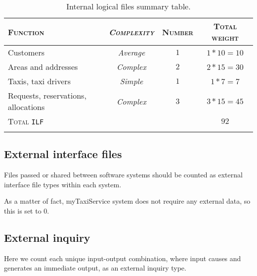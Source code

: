 \begin{table*}\begin{tabularx}{\textwidth}{ X >{\itshape}C{\myWFP} C{\myWFP} C{\myWFP} }

\toprule
	
	\normalfont\textsc{Function} &
	\normalfont\textsc{Complexity}	& 
	\normalfont\textsc{Number} &
	\normalfont\textsc{Total weight} \\

\toprule

	Customers	& Average	& $ 1 $		& $ 1*10 = 10 $ \\
\midrule
	Areas and addresses		& Complex	& $ 2 $		& $ 2*15 = 30 $ \\
\midrule
	Taxis, taxi drivers		& Simple		& $ 1 $		& $ 1*7 = 7 $ \\
\midrule
	Requests, reservations, allocations	& Complex	& $ 3 $ 	& $ 3*15 = 45 $ \\

\bottomrule

\normalfont\textsc{Total} \texttt{ILF} && & $ 92 $ \\

\bottomrule

\caption{Internal logical files summary table.}

\label{tab:ilf}\end{tabularx}\end{table*}





\subsection*{External interface files} 

Files passed or shared between software systems should be counted as external interface file types within each system.

As a matter of fact, myTaxiService system does not require any external data, so this is set to $ 0 $.







\subsection*{External inquiry}
 
Here we count each unique input-output combination, where input causes and generates an immediate output, as an external inquiry type.

